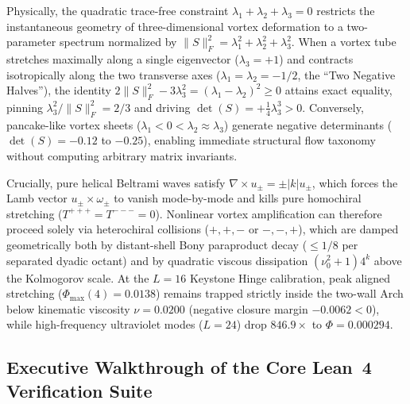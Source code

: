 \documentclass[10pt]{article}
\renewcommand{\_}{\OrigUnderscore\hspace{0pt}}
\numberwithin{equation}{section}
\begin{document}
Physically, the quadratic trace-free constraint $\lambda_1 + \lambda_2 + \lambda_3 = 0$ restricts the instantaneous geometry of three-dimensional vortex deformation to a two-parameter spectrum normalized by $\|S\|_F^2 = \lambda_1^2 + \lambda_2^2 + \lambda_3^2$. When a vortex tube stretches maximally along a single eigenvector ($\lambda_3 = +1$) and contracts isotropically along the two transverse axes ($\lambda_1 = \lambda_2 = -1/2$, the ``Two Negative Halves''), the identity $2\|S\|_F^2 - 3\lambda_3^2 = (\lambda_1-\lambda_2)^2 \ge 0$ attains exact equality, pinning $\lambda_3^2 / \|S\|_F^2 = 2/3$ and driving $\det(S) = +\frac{1}{4}\lambda_3^3 > 0$. Conversely, pancake-like vortex sheets ($\lambda_1 < 0 < \lambda_2 \approx \lambda_3$) generate negative determinants ($\det(S) = -0.12$ to $-0.25$), enabling immediate structural flow taxonomy without computing arbitrary matrix invariants.

Crucially, pure helical Beltrami waves satisfy $\nabla\times u_\pm = \pm|k| u_\pm$, which forces the Lamb vector $u_\pm \times \omega_\pm$ to vanish mode-by-mode and kills pure homochiral stretching ($T^{+++} = T^{---} = 0$). Nonlinear vortex amplification can therefore proceed solely via heterochiral collisions ($+,+,-$ or $-,-,+$), which are damped geometrically both by distant-shell Bony paraproduct decay ($\le 1/8$ per separated dyadic octant) and by quadratic viscous dissipation $(\nu_0^2+1)4^k$ above the Kolmogorov scale. At the $L=16$ Keystone Hinge calibration, peak aligned stretching ($\Phi_{\max}(4) = 0.0138$) remains trapped strictly inside the two-wall Arch below kinematic viscosity $\nu = 0.0200$ (negative closure margin $-0.0062 < 0$), while high-frequency ultraviolet modes ($L=24$) drop $846.9\times$ to $\Phi = 0.000294$.

\subsection{Executive Walkthrough of the Core Lean~4 Verification Suite}\label{subsec:app-ns-executive-certs}
\end{document}
